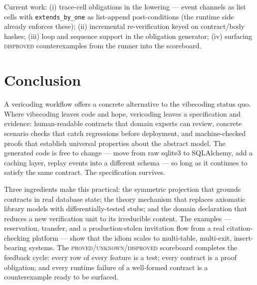 \documentclass[11pt,a4paper]{article}
\begin{document}
Current work: (i) trace-cell obligations in the lowering --- event
channels as list cells with \texttt{extends\_by\_one} as list-append
post-conditions (the runtime side already enforces these); (ii)
incremental re-verification keyed on contract/body hashes;
(iii) loop and sequence support in the obligation generator;
(iv) surfacing \textsc{disproved} counterexamples from the runner
into the scoreboard.

\section{Conclusion}\label{sec:conclusion}

A vericoding workflow offers a concrete alternative to the vibecoding status quo.  Where
vibecoding leaves code and hope, vericoding leaves a specification and
evidence: human-readable contracts that domain experts can review,
concrete scenario checks that catch regressions before deployment, and
machine-checked proofs that establish universal properties about the
abstract model.  The generated code is free to change --- move from
raw sqlite3 to SQLAlchemy, add a caching layer, replay events into a
different schema --- so long as it continues to satisfy the same
contract.  The specification survives.

Three ingredients make this practical: the symmetric projection that
grounds contracts in real database state; the theory mechanism that
replaces axiomatic library models with differentially-tested stubs;
and the domain declaration that reduces a new verification unit to its
irreducible content.  The examples --- reservation, transfer, and a
production-stolen invitation flow from a real citation-checking
platform --- show that the idiom scales to multi-table, multi-exit,
insert-bearing systems.  The
\textsc{proved}/\textsc{unknown}/\textsc{disproved} scoreboard
completes the feedback cycle: every row of every feature is a test;
every contract is a proof obligation; and every runtime failure of a
well-formed contract is a counterexample ready to be surfaced.
\end{document}
